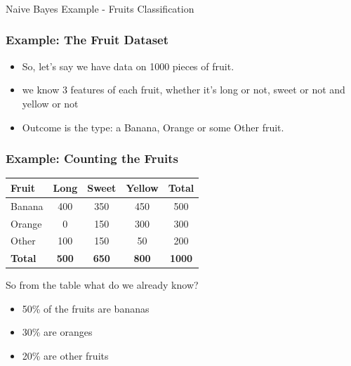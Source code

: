\begin{frame}[fragile]\frametitle{}
\begin{center}
{\Large Naive Bayes Example - Fruits Classification}
\end{center}
\end{frame}

\begin{frame}[fragile]\frametitle{Example: The Fruit Dataset}
\begin{itemize}
\item So, let's say we have data on 1000 pieces of fruit. 
\item we know 3 features of each fruit, whether it's long or not, sweet or not and yellow or not
\item Outcome is the type: a Banana, Orange or some Other fruit.
\end{itemize}
\end{frame}


\begin{frame}[fragile]\frametitle{Example: Counting the Fruits}
\begin{center}
\begin{tabular}{l|c|c|c|c}
\textbf{Fruit} & \textbf{Long} & \textbf{Sweet} & \textbf{Yellow} & \textbf{Total} \\ \hline
Banana & 400 & 350 & 450 & 500 \\
Orange & 0 & 150 & 300 & 300 \\
Other & 100 & 150 & 50 & 200 \\ \hline
\textbf{Total} & \textbf{500} & \textbf{650} & \textbf{800} & \textbf{1000}
\end{tabular}
\end{center}
So from the table what do we already know?
\begin{itemize}
\item     50\% of the fruits are bananas
\item     30\% are oranges
\item     20\% are other fruits
\end{itemize}

\end{frame}

